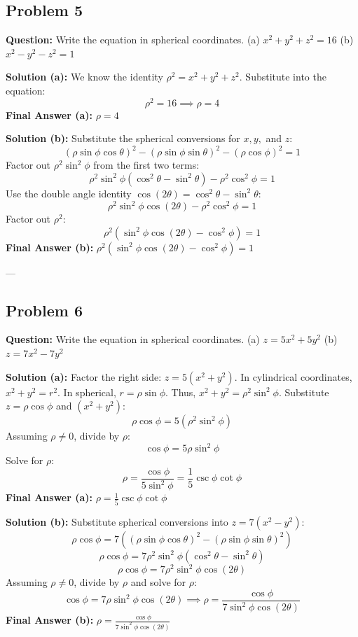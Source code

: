 \documentclass[12pt]{article}
\begin{document}
\subsection*{Problem 5}
\textbf{Question:} Write the equation in spherical coordinates.
(a) $x^2 + y^2 + z^2 = 16$
(b) $x^2 - y^2 - z^2 = 1$

\textbf{Solution (a):}
We know the identity $\rho^2 = x^2 + y^2 + z^2$.
Substitute into the equation:
\[ \rho^2 = 16 \implies \rho = 4 \]
\textbf{Final Answer (a):} $\rho = 4$

\textbf{Solution (b):}
Substitute the spherical conversions for $x, y,$ and $z$:
\[ (\rho \sin\phi \cos\theta)^2 - (\rho \sin\phi \sin\theta)^2 - (\rho \cos\phi)^2 = 1 \]
Factor out $\rho^2 \sin^2\phi$ from the first two terms:
\[ \rho^2 \sin^2\phi (\cos^2\theta - \sin^2\theta) - \rho^2 \cos^2\phi = 1 \]
Use the double angle identity $\cos(2\theta) = \cos^2\theta - \sin^2\theta$:
\[ \rho^2 \sin^2\phi \cos(2\theta) - \rho^2 \cos^2\phi = 1 \]
Factor out $\rho^2$:
\[ \rho^2 (\sin^2\phi \cos(2\theta) - \cos^2\phi) = 1 \]
\textbf{Final Answer (b):} $\rho^2 (\sin^2\phi \cos(2\theta) - \cos^2\phi) = 1$

---

\subsection*{Problem 6}
\textbf{Question:} Write the equation in spherical coordinates.
(a) $z = 5x^2 + 5y^2$
(b) $z = 7x^2 - 7y^2$

\textbf{Solution (a):}
Factor the right side: $z = 5(x^2 + y^2)$.
In cylindrical coordinates, $x^2 + y^2 = r^2$. In spherical, $r = \rho \sin\phi$. Thus, $x^2 + y^2 = \rho^2 \sin^2\phi$.
Substitute $z = \rho \cos\phi$ and $(x^2+y^2)$:
\[ \rho \cos\phi = 5(\rho^2 \sin^2\phi) \]
Assuming $\rho \neq 0$, divide by $\rho$:
\[ \cos\phi = 5\rho \sin^2\phi \]
Solve for $\rho$:
\[ \rho = \frac{\cos\phi}{5 \sin^2\phi} = \frac{1}{5} \csc\phi \cot\phi \]
\textbf{Final Answer (a):} $\rho = \frac{1}{5} \csc\phi \cot\phi$

\textbf{Solution (b):}
Substitute spherical conversions into $z = 7(x^2 - y^2)$:
\[ \rho \cos\phi = 7((\rho \sin\phi \cos\theta)^2 - (\rho \sin\phi \sin\theta)^2) \]
\[ \rho \cos\phi = 7\rho^2 \sin^2\phi (\cos^2\theta - \sin^2\theta) \]
\[ \rho \cos\phi = 7\rho^2 \sin^2\phi \cos(2\theta) \]
Assuming $\rho \neq 0$, divide by $\rho$ and solve for $\rho$:
\[ \cos\phi = 7\rho \sin^2\phi \cos(2\theta) \implies \rho = \frac{\cos\phi}{7 \sin^2\phi \cos(2\theta)} \]
\textbf{Final Answer (b):} $\rho = \frac{\cos\phi}{7 \sin^2\phi \cos(2\theta)}$
\end{document}
